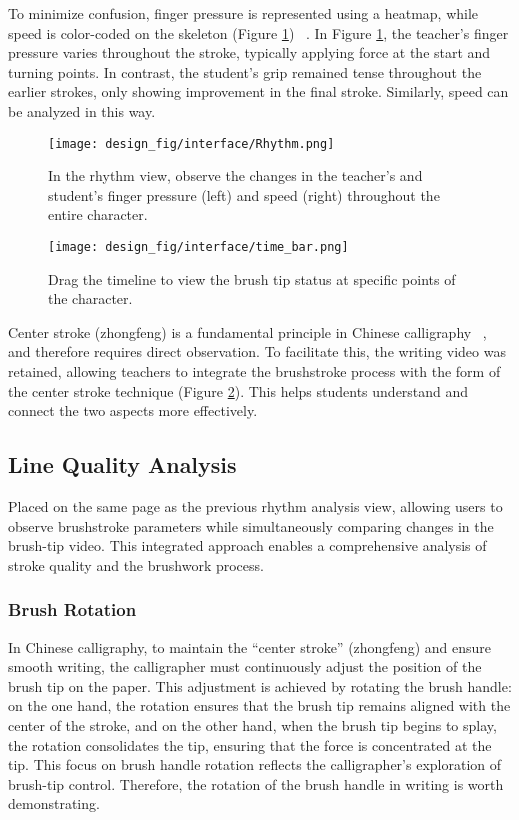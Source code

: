 To minimize confusion, finger pressure is represented using a heatmap, while speed is color-coded on the skeleton (Figure \ref{fig: Rhythm}) ~\cite{howe1983temporal}. In Figure \ref{fig: Rhythm}, the teacher's finger pressure varies throughout the stroke, typically applying force at the start and turning points. In contrast, the student's grip remained tense throughout the earlier strokes, only showing improvement in the final stroke. Similarly, speed can be analyzed in this way.
\begin{figure}[H]
    \centering
    \texttt{[image: design\_fig/interface/Rhythm.png]}
    \caption{In the rhythm view, observe the changes in the teacher's and student's finger pressure (left) and speed (right) throughout the entire character.}
    \label{fig: Rhythm}
\end{figure}

\begin{figure}[H]
    \centering
    \texttt{[image: design\_fig/interface/time\_bar.png]}
    \caption{Drag the timeline to view the brush tip status at specific points of the character.}
    \label{fig:time bar}
\end{figure}

Center stroke (zhongfeng) is a fundamental principle in Chinese calligraphy ~\cite{yi2021beginner, yang2009animating, yang2013animating}, and therefore requires direct observation. To facilitate this, the writing video was retained, allowing teachers to integrate the brushstroke process with the form of the center stroke technique (Figure \ref{fig:time bar}). This helps students understand and connect the two aspects more effectively.

\subsection{Line Quality Analysis}

Placed on the same page as the previous rhythm analysis view, allowing users to observe brushstroke parameters while simultaneously comparing changes in the brush-tip video. This integrated approach enables a comprehensive analysis of stroke quality and the brushwork process.

\subsubsection{Brush Rotation}
In Chinese calligraphy, to maintain the ``center stroke'' (zhongfeng) and ensure smooth writing, the calligrapher must continuously adjust the position of the brush tip on the paper\cite{chiang1974chinese}. This adjustment is achieved by rotating the brush handle: on the one hand, the rotation ensures that the brush tip remains aligned with the center of the stroke, and on the other hand, when the brush tip begins to splay, the rotation consolidates the tip, ensuring that the force is concentrated at the tip. This focus on brush handle rotation reflects the calligrapher's exploration of brush-tip control. Therefore, the rotation of the brush handle in writing is worth demonstrating.

